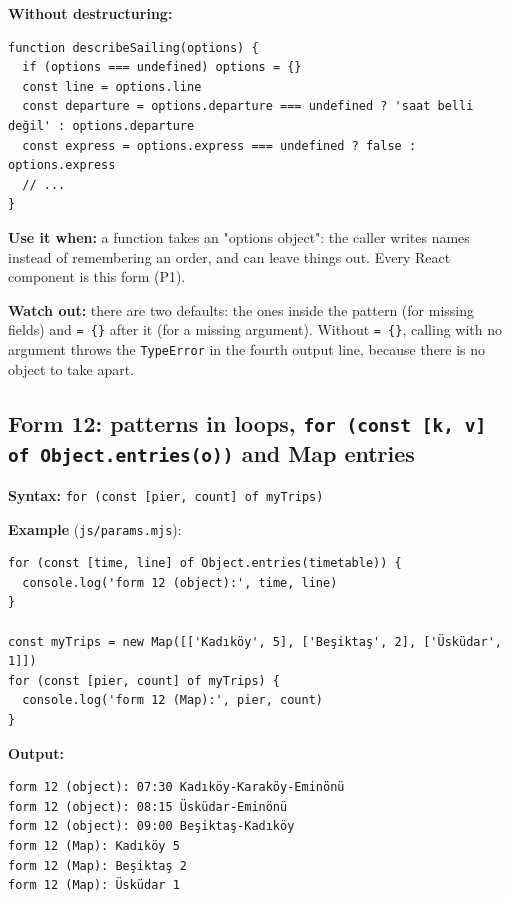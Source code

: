 \documentclass[
  10pt,
]{article}
\begin{document}
\textbf{Without destructuring:}

\begin{verbatim}
function describeSailing(options) {
  if (options === undefined) options = {}
  const line = options.line
  const departure = options.departure === undefined ? 'saat belli değil' : options.departure
  const express = options.express === undefined ? false : options.express
  // ...
}
\end{verbatim}

\textbf{Use it when:} a function takes an "options object": the caller
writes names instead of remembering an order, and can leave things out.
Every React component is this form (P1).

\textbf{Watch out:} there are two defaults: the ones inside the pattern
(for missing fields) and \texttt{=\allowbreak{} \{\}} after it (for a
missing argument). Without \texttt{=\allowbreak{} \{\}}, calling with no
argument throws the \texttt{TypeError} in the fourth output line,
because there is no object to take apart.

\hypertarget{form-12-patterns-in-loops-for-const-k-v-of-objectentrieso-and-map-entries}{%
\subsection{\texorpdfstring{Form 12: patterns in loops,
\texttt{for (\allowbreak{}const [\allowbreak{}k,\allowbreak{} v] of Object.\allowbreak{}entries(\allowbreak{}o))}
and Map
entries}{Form 12: patterns in loops,  and Map entries}}\label{form-12-patterns-in-loops-for-const-k-v-of-objectentrieso-and-map-entries}}

\textbf{Syntax:}
\texttt{for (\allowbreak{}const [\allowbreak{}pier,\allowbreak{} count] of myTrips)}

\textbf{Example} (\texttt{js/\allowbreak{}params.\allowbreak{}mjs}):

\begin{verbatim}
for (const [time, line] of Object.entries(timetable)) {
  console.log('form 12 (object):', time, line)
}

const myTrips = new Map([['Kadıköy', 5], ['Beşiktaş', 2], ['Üsküdar', 1]])
for (const [pier, count] of myTrips) {
  console.log('form 12 (Map):', pier, count)
}
\end{verbatim}

\textbf{Output:}

\begin{verbatim}
form 12 (object): 07:30 Kadıköy-Karaköy-Eminönü
form 12 (object): 08:15 Üsküdar-Eminönü
form 12 (object): 09:00 Beşiktaş-Kadıköy
form 12 (Map): Kadıköy 5
form 12 (Map): Beşiktaş 2
form 12 (Map): Üsküdar 1
\end{verbatim}
\end{document}
